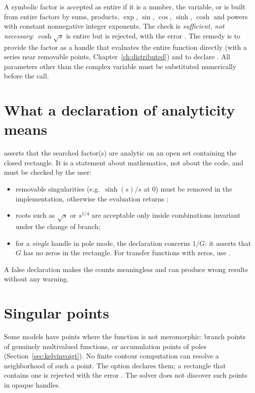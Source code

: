 A symbolic factor is accepted as entire if it is a number, the variable, or
is built from entire factors by sums, products, $\exp$, $\sin$, $\cos$,
$\sinh$, $\cosh$ and powers with constant nonnegative integer exponents.
The check is \emph{sufficient, not necessary}: $\cosh\sqrt s$ is entire but
is rejected, with the error . The
remedy is to provide the factor as a handle that evaluates the entire
function directly (with a series near removable points,
Chapter~\ref{ch:distributed}) and to declare . All
parameters other than the complex variable must be substituted numerically
before the call.

\section{What a declaration of analyticity means}

 asserts that the searched factor(s) are
analytic on an open set containing the closed rectangle. It is a statement
about mathematics, not about the code, and must be checked by the user:
\begin{itemize}
  \item removable singularities (e.g.\ $\sinh(s)/s$ at $0$) must be removed
        in the implementation, otherwise the evaluation returns ;
  \item roots such as $\sqrt s$ or $s^{1/4}$ are acceptable only inside
        combinations invariant under the change of branch;
  \item for a \emph{single} handle in pole mode, the declaration concerns
        $1/G$: it asserts that $G$ has no zeros in the rectangle. For
        transfer functions with zeros, use .
\end{itemize}
A false declaration makes the counts meaningless and can produce wrong
results without any warning.

\section{Singular points}

Some models have points where the function is not meromorphic: branch
points of genuinely multivalued functions, or accumulation points of poles
(Section~\ref{sec:kelvinvoigt}). No finite contour computation can resolve
a neighborhood of such a point. The option  declares
them; a rectangle that contains one is rejected with the error
. The solver does not discover
such points in opaque handles.

